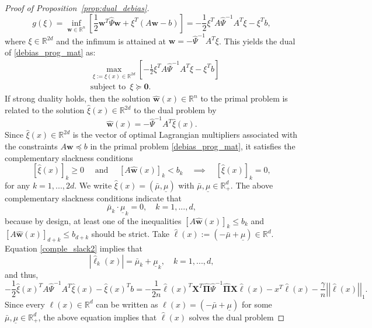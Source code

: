 \documentclass[ejsv2,noshowframe]{imsart}
\theoremstyle{plain}
\theoremstyle{definition}
\theoremstyle{remark}
\newcommand{\norm}[1]{\left|\left| #1 \right|\right|}
\renewcommand{\hat}{\widehat}
\begin{document}
\begin{proof}[Proof of Proposition~\ref{prop:dual_debias}]
\begin{equation}
		g(\xi) = \inf_{\bm{w}\in \mathbb{R}^n} \left[\frac{1}{2}\bm{w}^T \hat{\Psi} \bm{w} + \xi^T (A\bm{w}-b) \right] = -\frac{1}{2} \xi^T A\hat{\Psi}^{-1} A^T \xi - \xi^T b,
	\end{equation}
	where $\xi\in \mathbb{R}^{2d}$ and the infimum is attained at $\bm{w}=-\hat{\Psi}^{-1} A^T\xi$. This yields the dual of \eqref{debias_prog_mat} as:
	\begin{align*}
		&\max_{\xi:=\xi(x) \in \mathbb{R}^{2d}} \left[-\frac{1}{2} \xi^T A\hat{\Psi}^{-1} A^T \xi - \xi^T b \right] \\
		&\text{subject to } \,\xi \succeq \bm{0}.
	\end{align*}
	If strong duality holds, then the solution $\hat{\bm{w}}(x) \in \mathbb{R}^n$ to the primal problem is related to the solution $\hat{\xi}(x)\in \mathbb{R}^{2d}$ to the dual problem by
	\begin{equation}
		\label{primal_dual_sol}
		\hat{\bm{w}}(x) = -\hat{\Psi}^{-1} A^T \hat{\xi}(x).
	\end{equation}
	Since $\hat{\xi}(x)\in \mathbb{R}^{2d}$ is the vector of optimal Lagrangian multipliers associated with the constraints $A\bm{w}\preceq b$ in the primal problem \eqref{debias_prog_mat}, it satisfies the complementary slackness conditions
	$$\left[\hat{\xi}(x)\right]_k \geq 0 \quad \text{ and } \quad \left[A\hat{\bm{w}}(x)\right]_k < b_k \quad \implies \quad \left[\hat{\xi}(x)\right]_k=0,$$
	for any $ k=1,...,2d$. We write $\hat{\xi}(x) = \left(\bar{\mu}, \underline{\mu} \right)$ with $\bar{\mu},\underline{\mu} \in \mathbb{R}_+^d$. The above complementary slackness conditions indicate that
	\begin{equation}
		\label{comple_slack2}
		\bar{\mu}_k \cdot \underline{\mu}_k =0, \quad k=1,...,d,
	\end{equation}
	because by design, at least one of the inequalities $\left[A\hat{\bm{w}}(x)\right]_k \leq b_k$ and $\left[A\hat{\bm{w}}(x)\right]_{d+k} \leq b_{d+k}$ should be strict. Take $\hat{\ell}(x) := (-\bar{\mu}+\underline{\mu}) \in \mathbb{R}^d$. Equation \eqref{comple_slack2} implies that
	$$|\hat{\ell}_k(x)| = \bar{\mu}_k + \underline{\mu}_k, \quad k=1,...,d,$$
	and thus,
	$$-\frac{1}{2} \hat{\xi}(x)^T A\hat{\Psi}^{-1} A^T \hat{\xi}(x) - \hat{\xi}(x)^T b = -\frac{1}{2n} \hat{\ell}(x)^T \bm{X}^T \hat{\bm{\Pi}} \hat{\Psi}^{-1} \hat{\bm{\Pi}} \bm{X} \hat{\ell}(x) -x^T \hat{\ell}(x) - \frac{\gamma}{n} \norm{\hat{\ell}(x)}_1.$$
	Since every $\ell(x)\in \mathbb{R}^d$ can be written as $\ell(x)=\left(-\bar{\mu}+\underline{\mu}\right)$ for some $\bar{\mu},\underline{\mu} \in \mathbb{R}_+^d$, the above equation implies that $\hat{\ell}(x)$ solves the dual problem

\end{proof}
\end{document}
